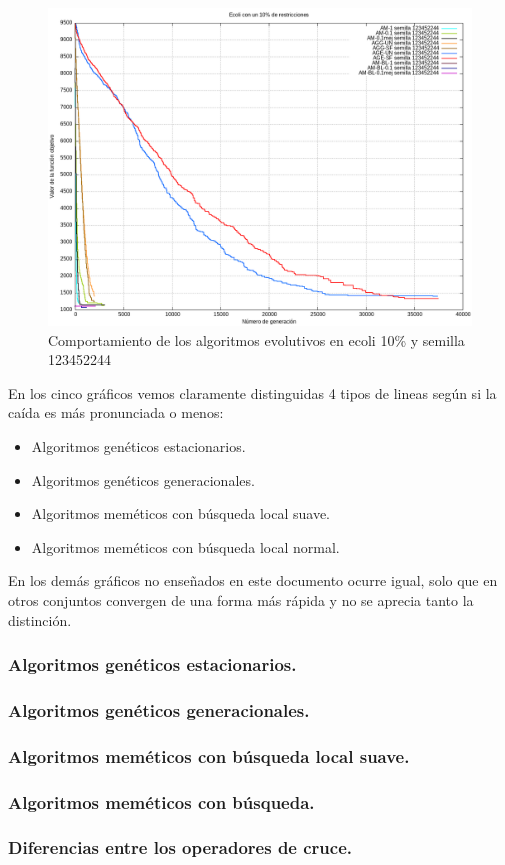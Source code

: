 \documentclass[12pt, spanish]{article}
\begin{document}
\begin{figure}[H]
  \centering
      \includegraphics[scale = 0.50]{ecoli_set_const_10_123452244.png}
 		 \caption{Comportamiento de los algoritmos evolutivos en ecoli 10\% y semilla 123452244}
  		\label{fig:g-213566}

\end{figure}

En los cinco gráficos vemos claramente distinguidas 4 tipos de lineas según si la caída es más pronunciada o menos:

\begin{itemize}
	\item Algoritmos genéticos estacionarios.
	\item Algoritmos genéticos generacionales.
	\item Algoritmos meméticos con búsqueda local suave.
	\item Algoritmos meméticos con búsqueda local normal.
\end{itemize}

En los demás gráficos no enseñados en este documento ocurre igual, solo que en otros conjuntos convergen de una forma más rápida y no se aprecia tanto la distinción.

\newpage

\subsubsection{Algoritmos genéticos estacionarios.}

\subsubsection{Algoritmos genéticos generacionales.}

\subsubsection{Algoritmos meméticos con búsqueda local suave.}

\subsubsection{Algoritmos meméticos con búsqueda.}

\subsubsection{Diferencias entre los operadores de cruce.}
\end{document}
